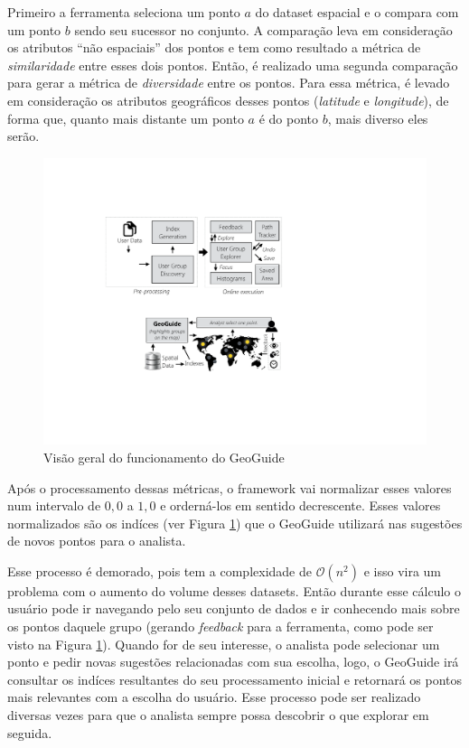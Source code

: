 Primeiro a ferramenta seleciona um ponto $a$ do dataset espacial e o compara com um ponto $b$ sendo seu sucessor no conjunto. A comparação leva em consideração os atributos ``não espaciais'' dos pontos e tem como resultado a métrica de \textit{similaridade} entre esses dois pontos. Então, é realizado uma segunda comparação para gerar a métrica de \textit{diversidade} entre os pontos. Para essa métrica, é levado em consideração os atributos geográficos desses pontos (\textit{latitude} e \textit{longitude}), de forma que, quanto mais distante um ponto $a$ é do ponto $b$, mais diverso eles serão.  

\begin{figure}[h]
	\centering
	\includegraphics[width=\textwidth]{images/geoguide-pre-processamento.pdf}
	\caption{Visão geral do funcionamento do GeoGuide}
	\label{fig:geoguide-pre-processamento}
	\vspace{-10pt}
\end{figure}

Após o processamento dessas métricas, o framework vai normalizar esses valores num intervalo de $0,0$ a $1,0$ e orderná-los em sentido decrescente. Esses valores normalizados são os indíces (ver Figura \ref{fig:geoguide-pre-processamento}) que o GeoGuide utilizará nas sugestões de novos pontos para o analista.

Esse processo é demorado, pois tem a complexidade de $\mathcal{O}(n^{2})$ e isso vira um problema com o aumento do volume desses datasets. Então durante esse cálculo o usuário pode ir navegando pelo seu conjunto de dados e ir conhecendo mais sobre os pontos daquele grupo (gerando \textit{feedback} para a ferramenta, como pode ser visto na Figura \ref{fig:geoguide-pre-processamento}). Quando for de seu interesse, o analista pode selecionar um ponto e pedir novas sugestões relacionadas com sua escolha, logo, o GeoGuide irá consultar os indíces resultantes do seu processamento inicial e retornará os pontos mais relevantes com a escolha do usuário. Esse processo pode ser realizado diversas vezes para que o analista sempre possa descobrir o que explorar em seguida.

